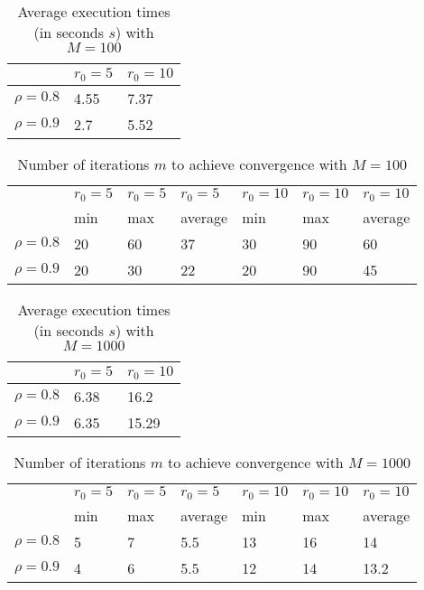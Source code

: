 \documentclass[a4paper,11pt,openright]{report}
\begin{document}
\begin{table}[H]
\centering
\addtolength{\leftskip}{-1.5cm}
\addtolength{\rightskip}{-1.5cm}
\begin{tabular}{|c|ll|}
\hline
$ $ & $r_0 = 5$ & $r_0 = 10$ \\
\hline
$\rho = 0.8$ & 4.55 & 7.37 \\
$\rho = 0.9$ & 2.7 & 5.52 \\
\hline
\end{tabular}
\caption{Average execution times (in seconds $s$) with $M = 100$}
\end{table}
\begin{table}[H]
\centering
\addtolength{\leftskip}{-1.5cm}
\addtolength{\rightskip}{-1.5cm}
\begin{tabular}{|c|llllll|}
\hline
$ $ & $r_0 = 5$ & $r_0 = 5$ & $r_0 = 5$ & $r_0 = 10$ & $r_0 = 10$ & $r_0 = 10$  \\
$ $ & min & max & average & min & max & average \\ 
\hline
$\rho = 0.8$ & 20 & 60 & 37 & 30 & 90 & 60\\
$\rho = 0.9$ & 20 & 30 & 22 & 20 & 90 & 45 \\
\hline
\end{tabular}
\caption{Number of iterations $m$ to achieve convergence with $M = 100$}
\end{table}
\begin{table}[H]
\centering
\addtolength{\leftskip}{-1.5cm}
\addtolength{\rightskip}{-1.5cm}
\begin{tabular}{|c|ll|}
\hline
$ $ & $r_0 = 5$ & $r_0 = 10$ \\
\hline
$\rho = 0.8$ & 6.38 & 16.2 \\
$\rho = 0.9$ & 6.35 & 15.29 \\
\hline
\end{tabular}
\caption{Average execution times (in seconds $s$) with $M = 1000$}
\end{table}
\begin{table}[H]
\centering
\addtolength{\leftskip}{-1.5cm}
\addtolength{\rightskip}{-1.5cm}
\begin{tabular}{|c|llllll|}
\hline
$ $ & $r_0 = 5$ & $r_0 = 5$ & $r_0 = 5$ & $r_0 = 10$ & $r_0 = 10$ & $r_0 = 10$  \\
$ $ & min & max & average & min & max & average \\ 
\hline
$\rho = 0.8$ & 5 & 7 & 5.5 & 13 & 16 & 14\\
$\rho = 0.9$ & 4 & 6 & 5.5 & 12 & 14 & 13.2 \\
\hline
\end{tabular}
\caption{Number of iterations $m$ to achieve convergence with $M = 1000$}
\end{table}
\newpage
\end{document}
